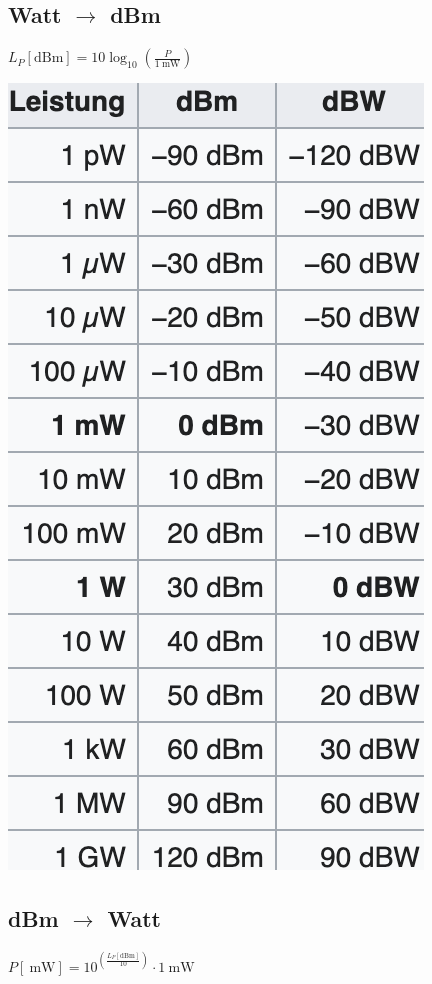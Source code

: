 \subsection{Watt $\rightarrow$ dBm}
$L_{P}[\mathrm{dBm}]=10 \log _{10}\left(\frac{P}{1 \mathrm{~mW}}\right)$
\vspace{-8pt}
\begin{center}
    \includegraphics[scale=.3]{graphic/signalparameter/dbm-tabelle.png}
\end{center}
\vspace{-8pt}


\subsection{dBm $\rightarrow$ Watt}
$P[\mathrm{~mW}]=10^{\left(\frac{L_{P}[\mathrm{dBm}]}{10}\right)} \cdot 1 \mathrm{~mW}$
